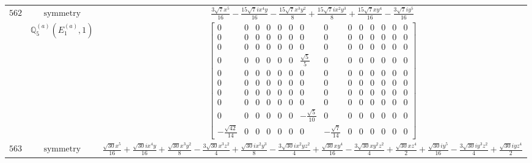 \documentclass[fleqn,8pt,landscape]{jsarticle}
\begin{document}
\begin{longtable}{ccc}
$ 562 $ & $ \text{symmetry} $ & $ \frac{3 \sqrt{7} x^{5}}{16} - \frac{15 \sqrt{7} i x^{4} y}{16} - \frac{15 \sqrt{7} x^{3} y^{2}}{8} + \frac{15 \sqrt{7} i x^{2} y^{3}}{8} + \frac{15 \sqrt{7} x y^{4}}{16} - \frac{3 \sqrt{7} i y^{5}}{16} $ \\
$  $ & $ \mathbb{Q}_{5}^{(a)}(E_{1}^{(a)},1) $ & $ \begin{bmatrix} 0 & 0 & 0 & 0 & 0 & 0 & 0 & 0 & 0 & 0 & 0 & 0 & 0 & 0 \\ 0 & 0 & 0 & 0 & 0 & 0 & 0 & 0 & 0 & 0 & 0 & 0 & 0 & 0 \\ 0 & 0 & 0 & 0 & 0 & 0 & 0 & 0 & 0 & 0 & 0 & 0 & 0 & 0 \\ 0 & 0 & 0 & 0 & 0 & 0 & \frac{\sqrt{5}}{5} & 0 & 0 & 0 & 0 & 0 & 0 & 0 \\ 0 & 0 & 0 & 0 & 0 & 0 & 0 & 0 & 0 & 0 & 0 & 0 & 0 & 0 \\ 0 & 0 & 0 & 0 & 0 & 0 & 0 & 0 & 0 & 0 & 0 & 0 & 0 & 0 \\ 0 & 0 & 0 & 0 & 0 & 0 & 0 & 0 & 0 & 0 & 0 & 0 & 0 & 0 \\ 0 & 0 & 0 & 0 & 0 & 0 & 0 & 0 & 0 & 0 & 0 & 0 & 0 & 0 \\ 0 & 0 & 0 & 0 & 0 & 0 & - \frac{\sqrt{5}}{10} & 0 & 0 & 0 & 0 & 0 & 0 & 0 \\ - \frac{\sqrt{42}}{14} & 0 & 0 & 0 & 0 & 0 & 0 & - \frac{\sqrt{7}}{14} & 0 & 0 & 0 & 0 & 0 & 0 \end{bmatrix} $ \\ \hline
$ 563 $ & $ \text{symmetry} $ & $ \frac{\sqrt{30} x^{5}}{16} + \frac{\sqrt{30} i x^{4} y}{16} + \frac{\sqrt{30} x^{3} y^{2}}{8} - \frac{3 \sqrt{30} x^{3} z^{2}}{4} + \frac{\sqrt{30} i x^{2} y^{3}}{8} - \frac{3 \sqrt{30} i x^{2} y z^{2}}{4} + \frac{\sqrt{30} x y^{4}}{16} - \frac{3 \sqrt{30} x y^{2} z^{2}}{4} + \frac{\sqrt{30} x z^{4}}{2} + \frac{\sqrt{30} i y^{5}}{16} - \frac{3 \sqrt{30} i y^{3} z^{2}}{4} + \frac{\sqrt{30} i y z^{4}}{2} $ \\

\end{longtable}
\end{document}
